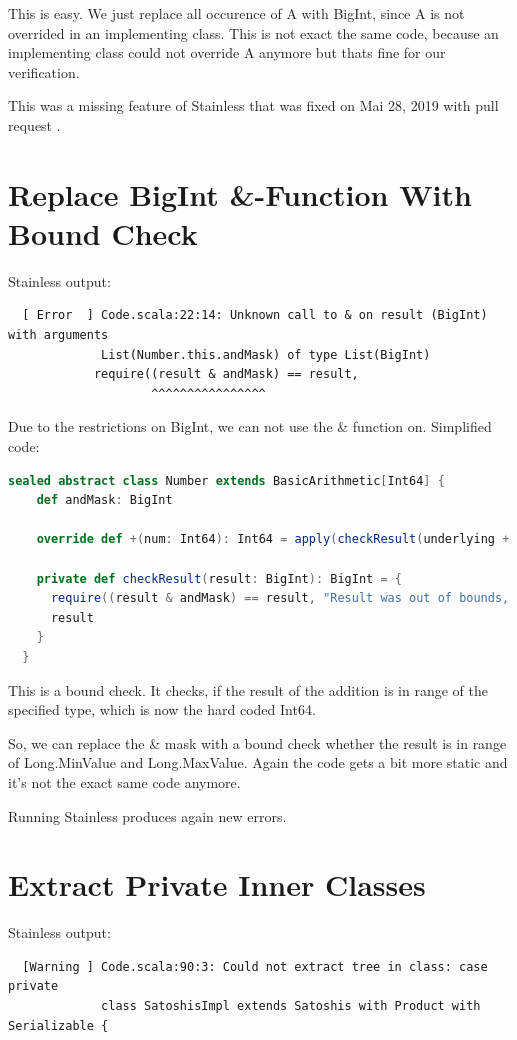 This is easy.
We just replace all occurence of A with BigInt, since A is not overrided in an implementing class.
This is not exact the same code, because an implementing class could not override A anymore but thats fine for our verification.

This was a missing feature of Stainless that was fixed on Mai 28, 2019 with pull request .


\section{Replace BigInt \&-Function With Bound Check}

Stainless output:
{\footnotesize\begin{verbatim}
  [ Error  ] Code.scala:22:14: Unknown call to & on result (BigInt) with arguments
             List(Number.this.andMask) of type List(BigInt)
            require((result & andMask) == result,
                    ^^^^^^^^^^^^^^^^
\end{verbatim}}

Due to the restrictions on BigInt, we can not use the \& function on.
Simplified code:
\begin{lstlisting}[language=scala]
  sealed abstract class Number extends BasicArithmetic[Int64] {
    def andMask: BigInt

    override def +(num: Int64): Int64 = apply(checkResult(underlying + num.underlying))

    private def checkResult(result: BigInt): BigInt = {
      require((result & andMask) == result, "Result was out of bounds, got: " + result)
      result
    }
  }
\end{lstlisting}

This is a bound check.
It checks, if the result of the addition is in range of the specified type, which is now the hard coded Int64.

So, we can replace the \& mask with a bound check whether the result is in range of Long.MinValue and Long.MaxValue.
Again the code gets a bit more static and it's not the exact same code anymore.

Running Stainless produces again new errors.


\section{Extract Private Inner Classes}

Stainless output:
{\footnotesize\begin{verbatim}
  [Warning ] Code.scala:90:3: Could not extract tree in class: case private
             class SatoshisImpl extends Satoshis with Product with Serializable {
\end{verbatim}}

